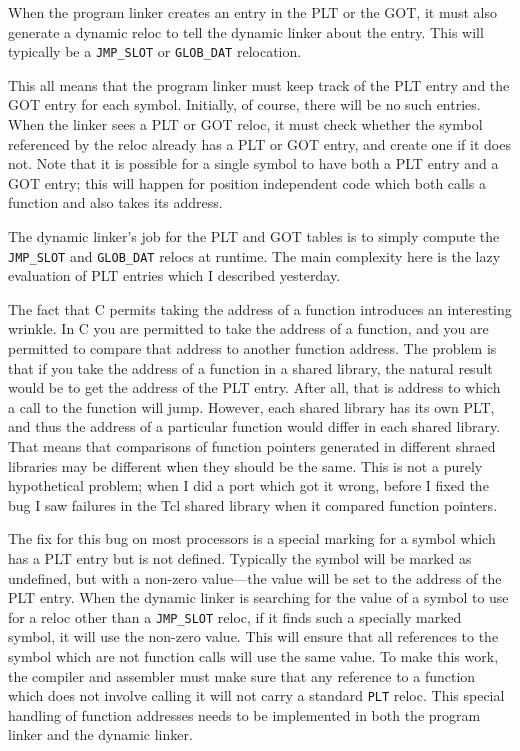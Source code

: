 When the program linker creates an entry in the PLT or the GOT, it must also
generate a dynamic reloc to tell the dynamic linker about the entry.  This will
typically be a \texttt{JMP\_SLOT} or \texttt{GLOB\_DAT} relocation.

This all means that the program linker must keep track of the PLT entry and the
GOT entry for each symbol.  Initially, of course, there will be no such
entries.  When the linker sees a PLT or GOT reloc, it must check whether the
symbol referenced by the reloc already has a PLT or GOT entry, and create one
if it does not.  Note that it is possible for a single symbol to have both a
PLT entry and a GOT entry; this will happen for position independent code which
both calls a function and also takes its address.

The dynamic linker's job for the PLT and GOT tables is to simply compute the
\texttt{JMP\_SLOT} and \texttt{GLOB\_DAT} relocs at runtime.  The main complexity
here is the lazy evaluation of PLT entries which I described yesterday.

The fact that C permits taking the address of a function introduces an
interesting wrinkle.  In C you are permitted to take the address of a function,
and you are permitted to compare that address to another function address.  The
problem is that if you take the address of a function in a shared library, the
natural result would be to get the address of the PLT entry.  After all, that
is address to which a call to the function will jump.  However, each shared
library has its own PLT, and thus the address of a particular function would
differ in each shared library.  That means that comparisons of function
pointers generated in different shraed libraries may be different when they
should be the same.  This is not a purely hypothetical problem; when I did a
port which got it wrong, before I fixed the bug I saw failures in the Tcl
shared library when it compared function pointers.

The fix for this bug on most processors is a special marking for a symbol which
has a PLT entry but is not defined.  Typically the symbol will be marked as
undefined, but with a non-zero value---the value will be set to the address of
the PLT entry.  When the dynamic linker is searching for the value of a symbol
to use for a reloc other than a \texttt{JMP\_SLOT} reloc, if it finds such a
specially marked symbol, it will use the non-zero value.  This will ensure that
all references to the symbol which are not function calls will use the same
value.  To make this work, the compiler and assembler must make sure that any
reference to a function which does not involve calling it will not carry a
standard \texttt{PLT} reloc.  This special handling of function addresses needs
to be implemented in both the program linker and the dynamic linker.

